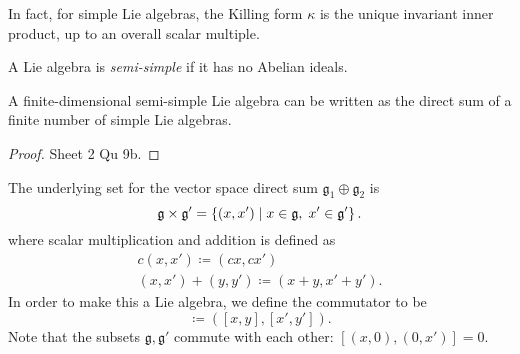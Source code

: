 
In fact, for simple Lie algebras, the Killing form $\kappa$ is the unique invariant inner product, up to an overall scalar multiple.

\begin{definition}[]
  A Lie algebra is \emph{semi-simple} if it has no Abelian ideals.
\end{definition}

\begin{claim}
  A finite-dimensional semi-simple Lie algebra can be written as the direct sum of a finite number of simple Lie algebras.
\end{claim}
\begin{proof}
  Sheet 2 Qu 9b.
\end{proof}
\begin{leftbar}
  \begin{note}
    The underlying set for the vector space direct sum $\mathfrak{g}_1 \oplus \mathfrak{g}_2$ is 
    \begin{equation}
      \mathfrak{g} \times \mathfrak{g}' = \left\{ (x, x') \suchthat x \in \mathfrak{g},\; x' \in \mathfrak{g}' \right\}.
    \end{equation}
    where scalar multiplication and addition is defined as
    \begin{gather}
      c(x, x') \coloneqq (cx, cx') \\
      (x, x') + (y, y') \coloneqq (x + y, x' + y').
    \end{gather}
    In order to make this a Lie algebra, we define the commutator to be
    \begin{equation}
      [(x, x'), (y, y')] \coloneqq([x, y], [x', y']).
    \end{equation}
    Note that the subsets $\mathfrak{g}, \mathfrak{g}'$ commute with each other: $[(x, 0), (0, x')] = 0$.
  \end{note} 
\end{leftbar}

